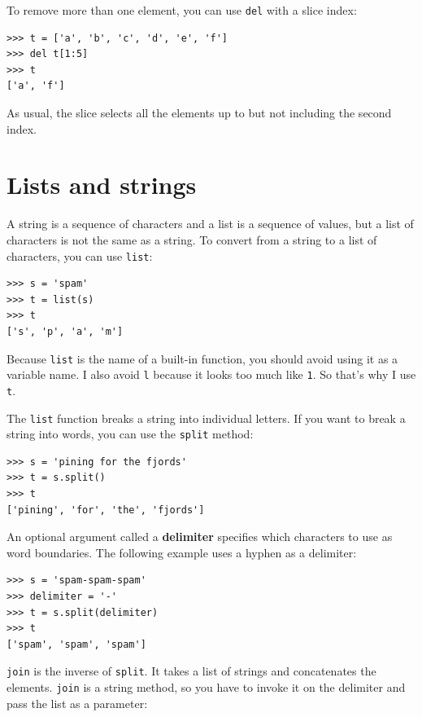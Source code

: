 \documentclass[10pt]{book}
\begin{document}
To remove more than one element, you can use {\tt del} with
a slice index:

\begin{verbatim}
>>> t = ['a', 'b', 'c', 'd', 'e', 'f']
>>> del t[1:5]
>>> t
['a', 'f']
\end{verbatim}
%
As usual, the slice selects all the elements up to but not
including the second index.



\section{Lists and strings}

A string is a sequence of characters and a list is a sequence
of values, but a list of characters is not the same as a
string.  To convert from a string to a list of characters,
you can use {\tt list}:

\begin{verbatim}
>>> s = 'spam'
>>> t = list(s)
>>> t
['s', 'p', 'a', 'm']
\end{verbatim}
%
Because {\tt list} is the name of a built-in function, you should
avoid using it as a variable name.  I also avoid {\tt l} because
it looks too much like {\tt 1}.  So that's why I use {\tt t}.

The {\tt list} function breaks a string into individual letters.  If
you want to break a string into words, you can use the {\tt split}
method:

\begin{verbatim}
>>> s = 'pining for the fjords'
>>> t = s.split()
>>> t
['pining', 'for', 'the', 'fjords']
\end{verbatim}
%
An optional argument called a {\bf delimiter} specifies which
characters to use as word boundaries.
The following example
uses a hyphen as a delimiter:

\begin{verbatim}
>>> s = 'spam-spam-spam'
>>> delimiter = '-'
>>> t = s.split(delimiter)
>>> t
['spam', 'spam', 'spam']
\end{verbatim}
%
{\tt join} is the inverse of {\tt split}.  It
takes a list of strings and
concatenates the elements.  {\tt join} is a string method,
so you have to invoke it on the delimiter and pass the
list as a parameter:
\end{document}
